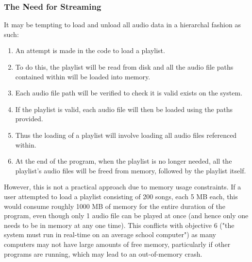 \subsubsection{The Need for Streaming}
It may be tempting to load and unload all audio data in a hierarchal  fashion as such:
\begin{enumerate}
	\item An attempt is made in the code to load a playlist.
	\item To do this, the playlist will be read from disk and all the audio file paths contained within will be loaded into memory.
	\item Each audio file path will be verified to check it is valid exists on the system.
	\item If the playlist is valid, each audio file will then be loaded using the paths provided.
	\item Thus the loading of a playlist will involve loading all audio files referenced within.
	\item At the end of the program, when the playlist is no longer needed, all the playlist's audio files will be freed from memory, followed by the playlist itself.
\end{enumerate}

However, this is not a practical approach due to memory usage constraints. If a user attempted to load a playlist consisting of 200 songs, each 5 MB each, this would consume roughly 1000 MB of memory for the entire duration of the program, even though only 1 audio file can be played at once (and hence only one needs to be in memory at any one time). This conflicts with objective 6 ("the system must run in real-time on an average school computer") as many computers may not have large amounts of free memory, particularly if other programs are running, which may lead to an out-of-memory crash. 

